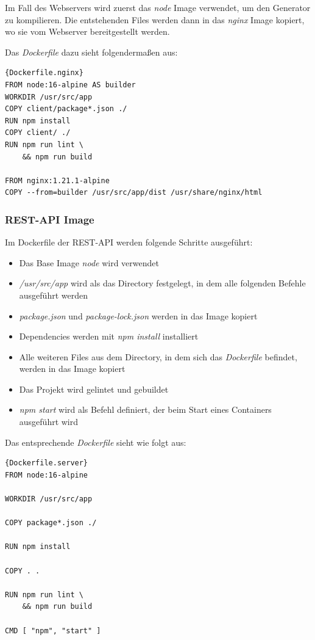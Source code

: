 Im Fall des Webservers wird zuerst das \textit{node} Image verwendet, um den Generator zu kompilieren.
Die entstehenden Files werden dann in das \textit{nginx} Image kopiert, wo sie vom Webserver bereitgestellt werden.

Das \textit{Dockerfile} dazu sieht folgendermaßen aus:

\begin{lstlisting}[label={lst:Dockerfile.nginx}]{Dockerfile.nginx}
FROM node:16-alpine AS builder
WORKDIR /usr/src/app
COPY client/package*.json ./
RUN npm install
COPY client/ ./
RUN npm run lint \
    && npm run build

FROM nginx:1.21.1-alpine
COPY --from=builder /usr/src/app/dist /usr/share/nginx/html
\end{lstlisting}

\subsubsection{REST-API Image}
Im Dockerfile der REST-API werden folgende Schritte ausgeführt:

\begin{itemize}
  \item Das Base Image \textit{node} wird verwendet
  \item \textit{/usr/src/app} wird als das Directory festgelegt, in dem alle folgenden Befehle ausgeführt werden
  \item \textit{package.json} und \textit{package-lock.json} werden in das Image kopiert
  \item Dependencies werden mit \textit{npm install} installiert
  \item Alle weiteren Files aus dem Directory, in dem sich das \textit{Dockerfile} befindet, werden in das Image kopiert
  \item Das Projekt wird gelintet und gebuildet
  \item \textit{npm start} wird als Befehl definiert, der beim Start eines Containers ausgeführt wird
\end{itemize}

Das entsprechende \textit{Dockerfile} sieht wie folgt aus:

\begin{lstlisting}[label={lst:Dockerfile.server}]{Dockerfile.server}
FROM node:16-alpine

WORKDIR /usr/src/app

COPY package*.json ./

RUN npm install

COPY . .

RUN npm run lint \
    && npm run build

CMD [ "npm", "start" ]
\end{lstlisting}

